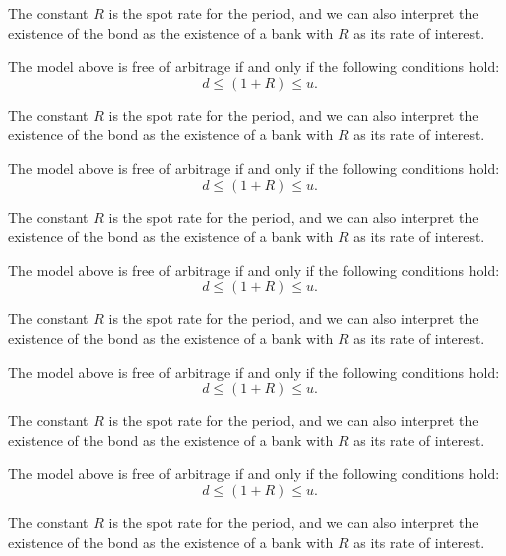 \documentclass{Base}
\begin{document}
The constant $R$ is the spot rate for the period, and we can also
interpret the existence of the bond as the existence of a bank
with $R$ as its rate of interest.

\begin{assumption}
The model above is free of arbitrage if and only if the following
conditions hold:
\begin{equation}\label{noarb}
d \leq (1+R) \leq u.
\end{equation}
\end{assumption}

The constant $R$ is the spot rate for the period, and we can also
interpret the existence of the bond as the existence of a bank
with $R$ as its rate of interest.

\begin{condition}
The model above is free of arbitrage if and only if the following
conditions hold:
\begin{equation}\label{noarb}
d \leq (1+R) \leq u.
\end{equation}
\end{condition}


The constant $R$ is the spot rate for the period, and we can also
interpret the existence of the bond as the existence of a bank
with $R$ as its rate of interest.

\begin{idea}
The model above is free of arbitrage if and only if the following
conditions hold:
\begin{equation}\label{noarb}
d \leq (1+R) \leq u.
\end{equation}
\end{idea}

The constant $R$ is the spot rate for the period, and we can also
interpret the existence of the bond as the existence of a bank
with $R$ as its rate of interest.

\begin{remark}
The model above is free of arbitrage if and only if the following
conditions hold:
\begin{equation}\label{noarb}
d \leq (1+R) \leq u.
\end{equation}
\end{remark}

The constant $R$ is the spot rate for the period, and we can also
interpret the existence of the bond as the existence of a bank
with $R$ as its rate of interest.

\begin{result}
The model above is free of arbitrage if and only if the following
conditions hold:
\begin{equation}\label{noarb}
d \leq (1+R) \leq u.
\end{equation}
\end{result}
The constant $R$ is the spot rate for the period, and we can also
interpret the existence of the bond as the existence of a bank
with $R$ as its rate of interest.
\end{document}
